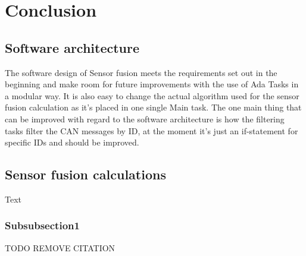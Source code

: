 \section{Conclusion}\label{sec:conclusion}
\subsection{Software architecture}
The software design of Sensor fusion meets the requirements set out in the
beginning and make room for future improvements with the use of Ada Tasks
in a modular way. It is also easy to change the actual algorithm used for the
sensor fusion calculation as it's placed in one single Main task. The one main
thing that can be improved with regard to the software architecture is how
the filtering tasks filter the CAN messages by ID, at the moment it's just an
if-statement for specific IDs and should be improved.

\subsection{Sensor fusion calculations}
Text

\subsubsection{Subsubsection1}
TODO REMOVE CITATION\cite{web:vagrant}
